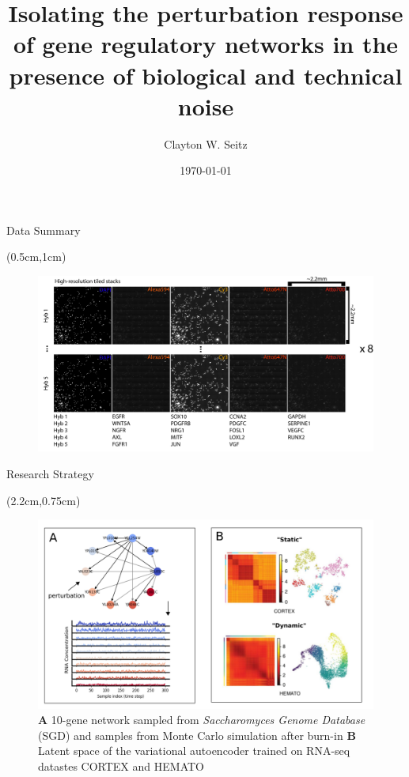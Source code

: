 \documentclass[aspectratio=1610]{beamer}					%
\title{Isolating the perturbation response of gene regulatory networks in the presence of biological and technical noise}	%
\author{Clayton W. Seitz}								%
\date{\today}									%
\begin{document}
\begin{frame}
  \titlepage
\end{frame}

%

\begin{frame}{Data Summary}

\begin{textblock*}{15cm}(0.5cm,1cm)
\begin{figure}
\includegraphics[width=15cm]{data-summary.png}
\end{figure}
\end{textblock*}

\end{frame}

\begin{frame}{Research Strategy}

\begin{textblock*}{12cm}(2.2cm,0.75cm)
\begin{figure}
\includegraphics[width=12cm]{sketch.png}
\caption{\textbf{A} 10-gene network sampled from \emph{Saccharomyces Genome Database} (SGD) and samples from Monte Carlo simulation after burn-in \textbf{B} Latent space of the variational autoencoder trained on RNA-seq datastes CORTEX and HEMATO}
\end{figure}
\end{textblock*}

\end{frame}
\end{document}
